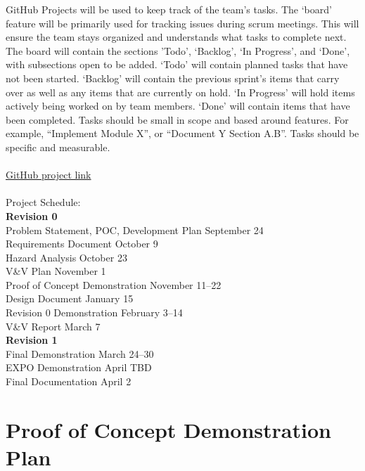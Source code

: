 \documentclass{article}
\begin{document}
GitHub Projects will be used to keep track of the team’s tasks. The ‘board’ feature will be primarily used for tracking issues during scrum meetings. This will ensure the team stays organized and understands what tasks to complete next.
The board will contain the sections ’Todo’, ‘Backlog’, ‘In Progress’, and ‘Done’, with subsections open to be added. ‘Todo’ will contain planned tasks that have not been started. ‘Backlog’ will contain the previous sprint’s items that carry over as well as any items that are currently on hold. ‘In Progress’ will hold items actively being worked on by team members. ‘Done’ will contain items that have been completed.
Tasks should be small in scope and based around features. For example, “Implement Module X”, or “Document Y Section A.B”. Tasks should be specific and measurable.
\\\\
\href{https://github.com/users/Nicholas-Fabugais-Inaba/projects/3}{GitHub project link}
\\\\
Project Schedule:\\
\indent \textbf{Revision 0}\\
\indent Problem Statement, POC, Development Plan \hfill September 24\\
\indent Requirements Document \hfill October 9\\
\indent Hazard Analysis \hfill October 23\\
\indent V\&V Plan \hfill November 1\\
\indent Proof of Concept Demonstration \hfill November 11--22\\
\indent Design Document \hfill January 15\\
\indent Revision 0 Demonstration \hfill February 3--14\\
\indent V\&V Report \hfill March 7\\
\indent \textbf{Revision 1}\\
\indent Final Demonstration \hfill March 24--30\\
\indent EXPO Demonstration \hfill April TBD\\
\indent Final Documentation \hfill April 2\\

\section{Proof of Concept Demonstration Plan}
\end{document}
